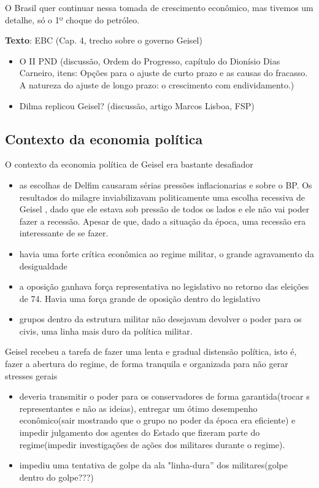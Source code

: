 \documentclass[a4paper,12pt]{article}[abntex2]
\begin{document}
O Brasil quer continuar nessa tomada de crescimento econômico, mas tivemos um detalhe, só o 1º choque do petróleo.

\textbf{Texto}: EBC (Cap. 4, trecho sobre o governo Geisel)\begin{itemize}
    \item O II PND (discussão, Ordem do Progresso, capítulo do  Dionísio Dias Carneiro, itens: Opções para o ajuste de curto prazo e as causas do fracasso. A natureza do ajuste de longo prazo: o crescimento com endividamento.)
    \item Dilma replicou Geisel? (discussão, artigo Marcos Lisboa, FSP)
\end{itemize}

\subsection{\textbf{Contexto da economia política}}
O contexto da economia política de Geisel era bastante desafiador\begin{itemize}
    \item as escolhas de Delfim causaram sérias pressões inflacionarias e sobre o BP. Os resultados do milagre inviabilizavam politicamente uma escolha recessiva de Geisel , dado que ele estava sob pressão de todos os lados e ele não vai poder fazer a recessão. Apesar de que, dado a situação da época, uma recessão era interessante de se fazer. 
    \item havia uma forte crítica econômica ao regime militar, o grande agravamento da desigualdade
    \item a oposição ganhava força representativa no legislativo no retorno das eleições de 74. Havia uma força grande de oposição dentro do legislativo 
    \item grupos dentro da estrutura militar não desejavam devolver o poder para os civis, uma linha mais duro da política militar.
\end{itemize}

Geisel recebeu a tarefa de fazer uma lenta e gradual distensão política, isto é, fazer a abertura do regime, de forma tranquila e organizada para não gerar stresses gerais\begin{itemize}
    \item deveria transmitir o poder para os conservadores de forma garantida(trocar s representantes e não as ideias), entregar um ótimo desempenho econômico(sair mostrando que o grupo no poder da época era eficiente) e impedir julgamento dos agentes do Estado que fizeram parte do regime(impedir investigações de ações dos militares durante o regime).
    \item impediu uma tentativa de golpe da ala "linha-dura” dos militares(golpe dentro do golpe???)
\end{itemize}
\end{document}

